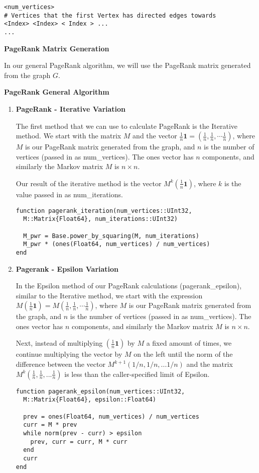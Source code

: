 \documentclass[12pt, titlepage, twoside]{amsart}
\renewcommand{\vec}[1]{\ensuremath{\mathbf{#1}}}
\theoremstyle{remark}
\begin{document}
\begin{lstlisting}[basicstyle=\small]
<num_vertices>
# Vertices that the first Vertex has directed edges towards
<Index> <Index> < Index > ...
...
\end{lstlisting}

\textbf{PageRank Matrix Generation}

In our general PageRank algorithm, we will use the PageRank matrix generated from the graph $G$.

\textbf{PageRank General Algorithm}

\begin{enumerate}

\item \textbf{PageRank - Iterative Variation}

The first method that we can use to calculate PageRank is the Iterative method. We start with the matrix $M$ and the vector $\frac{1}{n}\vec{1} = (\frac{1}{n}, \frac{1}{n}, \cdots \frac{1}{n})$, where $M$ is our PageRank matrix generated from the graph, and $n$ is the number of vertices (passed in as num\_vertices). The ones vector has $n$ components, and similarly the Markov matrix $M$ is $n\times n$.

Our result of the iterative method is the vector $M^k (\frac{1}{n}\vec{1})$, where $k$ is the value passed in as num\_iterations.

\begin{verbatim}
function pagerank_iteration(num_vertices::UInt32,
  M::Matrix{Float64}, num_iterations::UInt32)
  
  M_pwr = Base.power_by_squaring(M, num_iterations)
  M_pwr * (ones(Float64, num_vertices) / num_vertices)
end
\end{verbatim}


\item \textbf{Pagerank - Epsilon Variation}

In the Epsilon method of our PageRank calculations (pagerank\_epsilon), similar to the Iterative method, we start with the expression $M(\frac{1}{n}\vec{1}) = M(\frac{1}{n}, \frac{1}{n}, \cdots \frac{1}{n})$, where $M$ is our PageRank matrix generated from the graph, and $n$ is the number of vertices (passed in as num\_vertices). The ones vector has $n$ components, and similarly the Markov matrix $M$ is $n\times n$.

Next, instead of multiplying $(\frac{1}{n}\vec{1})$ by $M$ a fixed amount of times, we continue multiplying the vector by $M$ on the left until the norm of the difference between the vector $M^{k+1}(1/n, 1/n, ... 1/n)$ and the matrix $M^k(\frac{1}{n}, \frac{1}{n}, ... \frac{1}{n})$ is less than the caller-specified limit of Epsilon.

\begin{lstlisting}
function pagerank_epsilon(num_vertices::UInt32, 
  M::Matrix{Float64}, epsilon::Float64)
  
  prev = ones(Float64, num_vertices) / num_vertices
  curr = M * prev
  while norm(prev - curr) > epsilon
    prev, curr = curr, M * curr
  end
  curr
end
\end{lstlisting}

\end{enumerate}
\end{document}
